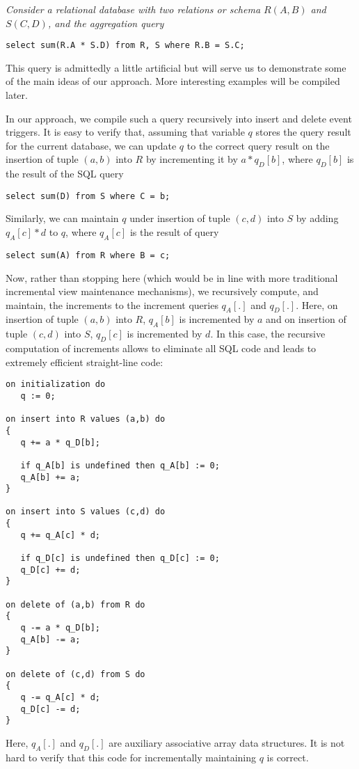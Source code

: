 \begin{example}\em
Consider a relational database with two relations or schema $R(A,B)$ and
$S(C,D)$, and the aggregation query
\begin{verbatim}
select sum(R.A * S.D) from R, S where R.B = S.C;
\end{verbatim}
This query is admittedly a little artificial but will serve us to demonstrate
some of the main ideas of our approach. More interesting examples will be
compiled later.

In our approach, we compile such a query recursively
into insert and delete event triggers.
It is easy to verify that, assuming that variable $q$ stores the query result
for the current database, we can update $q$ to the correct query result on the
insertion of tuple $(a,b)$ into $R$ by incrementing it by $a * q_D[b]$,
where $q_D[b]$ is the result of the SQL query
\begin{verbatim}
select sum(D) from S where C = b;
\end{verbatim}
Similarly, we can maintain $q$ under insertion of tuple $(c,d)$
into $S$ by adding $q_A[c] * d$ to $q$, where $q_A[c]$ is the result of
query
\begin{verbatim}
select sum(A) from R where B = c;
\end{verbatim}
Now, rather than stopping here (which would be in line with more traditional
incremental view maintenance mechanisms), we recursively compute, and maintain,
the increments to the increment queries $q_A[.]$ and $q_D[.]$.
Here, on insertion of tuple $(a,b)$ into $R$, $q_A[b]$ is incremented by $a$
and on insertion of tuple $(c,d)$ into $S$, $q_D[c]$ is incremented by $d$.
In this case, the recursive computation of increments allows to eliminate
all SQL code and leads to extremely efficient straight-line code:
\begin{verbatim}
on initialization do
   q := 0;

on insert into R values (a,b) do
{
   q += a * q_D[b];

   if q_A[b] is undefined then q_A[b] := 0;
   q_A[b] += a;
}

on insert into S values (c,d) do
{
   q += q_A[c] * d;

   if q_D[c] is undefined then q_D[c] := 0;
   q_D[c] += d;
}

on delete of (a,b) from R do
{
   q -= a * q_D[b];
   q_A[b] -= a;
}

on delete of (c,d) from S do
{
   q -= q_A[c] * d;
   q_D[c] -= d;
}
\end{verbatim}
Here, $q_A[.]$ and $q_D[.]$ are auxiliary associative array data structures.
It is not hard to verify that this code for incrementally maintaining $q$ is
correct.


\end{example}

